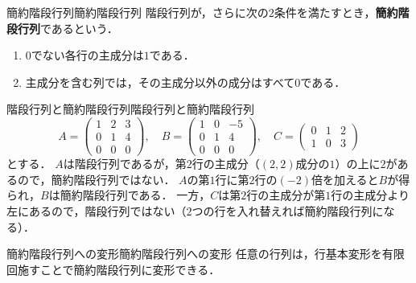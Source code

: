 \begin{definition}{簡約階段行列}{簡約階段行列}
  階段行列が，さらに次の$2$条件を満たすとき，\textbf{簡約階段行列}であるという．
  \begin{enumerate}[label=(\roman*),leftmargin=3.2em,start=3]
    \item $0$でない各行の主成分は$1$である．
    \item 主成分を含む列では，その主成分以外の成分はすべて$0$である．
  \end{enumerate}
\end{definition}

\begin{example}{階段行列と簡約階段行列}{階段行列と簡約階段行列}
  \[
    A = \begin{pmatrix} 1 & 2 & 3 \\ 0 & 1 & 4 \\ 0 & 0 & 0 \end{pmatrix}, \quad
    B = \begin{pmatrix} 1 & 0 & -5 \\ 0 & 1 & 4 \\ 0 & 0 & 0 \end{pmatrix}, \quad
    C = \begin{pmatrix} 0 & 1 & 2 \\ 1 & 0 & 3 \end{pmatrix}
  \]
  とする．
  $A$は階段行列であるが，第$2$行の主成分（$(2, 2)$成分の$1$）の上に$2$があるので，簡約階段行列ではない．
  $A$の第$1$行に第$2$行の$(-2)$倍を加えると$B$が得られ，$B$は簡約階段行列である．
  一方，$C$は第$2$行の主成分が第$1$行の主成分より左にあるので，階段行列ではない（$2$つの行を入れ替えれば簡約階段行列になる）．
\end{example}

\begin{prop}{簡約階段行列への変形}{簡約階段行列への変形}
  任意の行列は，行基本変形を有限回施すことで簡約階段行列に変形できる．
\end{prop}


